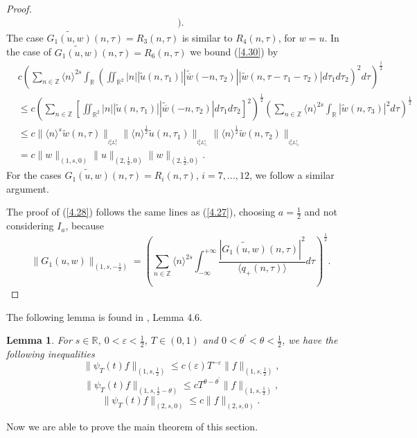 \documentclass[reqno]{amsart}
\newtheorem{lemma}{Lemma}[section]
\numberwithin{equation}{section}
\begin{document}
\begin{proof}
\begin{align*}
{)}\text{.}
\end{align*}
The case $\widetilde{G_{1}(u,w)}(n,\tau)=R_{3}(n,\tau)$ is similar
to $R_{4}(n,\tau)$, for $w=u$. In the case of $\widetilde{G_{1}(u,w)}(n,\tau)=R_{6}(n,\tau)$ we bound (\ref{4.30}) by
\begin{equation*}
\begin{split}
&  c\left(  \sum\limits_{n\in\mathbb{Z}}\langle n\rangle^{2s}\int
\nolimits_{\mathbb{R}}\left(
\iint\nolimits_{\mathbb{R}^{2}}| n| |\widetilde{u}(n,\tau_{1})|
|\widetilde{\overline{w}}(-n,\tau_{2})|
|\widetilde {w}(n,\tau-\tau_{1}-\tau_{2})| d\tau_{1}d\tau_{2}\right)  ^{2}d\tau\right)  ^{\frac{1}{2}}\\
&  \leq c\left(  \sum\limits_{n\in\mathbb{Z}}\left[  \iint
\nolimits_{\mathbb{R}^{2}}| n| |\widetilde {u}(n,\tau_{1})|
|\widetilde{\overline{w}}(-n,\tau_{2})| d\tau_{1}d\tau_{2}\right]^{2}\right)^{\frac{1}{2}}
\left(\sum\limits_{n\in\mathbb{Z}}\langle n\rangle^{2s}
\int\nolimits_{\mathbb{R}}|\widetilde{w}(n,\tau_3)| ^{2}d\tau\right)^{\frac{1}{2}}\\
&  \leq c\| \langle n\rangle^{s}\widetilde{w}(n,\tau)\|_{_{l_{n}^{2}L_{\tau}^{2}}}
\|\langle n\rangle^{\frac{1}{2}}\widetilde{u}(n,\tau_{1})\|_{_{l_{n}^{2}L_{\tau_{1}}^{1}}}
\| \langle n\rangle^{\frac{1}{2}}\widetilde{w}(n,\tau_{2})\|_{_{l_{n}^{2}L_{\tau_{2}}^{1}}}\\
&  =c\| w\| _{(1,s,0)}\| u\| _{(2,\frac12,0)}\| w\| _{(2,\frac12,0)}.
\end{split}
\end{equation*}
For the cases $\widetilde{G_{1}(u,w)}(n,\tau)=R_{i}(n,\tau)$,
$i=7,...,12$, we follow a similar argument.

The proof of (\ref{4.28}) follows the same lines as (\ref{4.27}), choosing
$a=\frac{1}{2}$ and not considering $I_{a}$, because
\begin{equation}\label{4.45}
\| G_{1}(u,w)\| _{(1,s,- \frac12 )}=\left(
\sum\limits_{n\in\mathbb{Z}}\langle n\rangle^{2s}\int_{-\infty
}^{+\infty}\frac{| \widetilde{G_{1}(u,w)}(n,\tau)| ^{2}}{\langle q_{+}(n,\tau)\rangle}d\tau\right)  ^{\frac{1}{2}}\text{.}\end{equation}
\end{proof}
The following lemma is found in \cite{38}, Lemma 4.6.
\begin{lemma} For  $s\in\mathbb{R}$, $0<\varepsilon<\frac{1}{2}$, $T\in\left(
0,1\right)$ and $0<\theta^{\prime}<\theta<\frac{1}{2}$, we have the following
inequalities\[
\| \psi_{T}(t)f\| _{(1,s, \frac12)}
\leq c(\varepsilon)T^{-\varepsilon}\| f\| _{(1,s,\frac12
)}\text{,}
\]
\[
\| \psi_{T}(t)f\| _{(1,s,
\frac12
-\theta)}\leq cT^{\theta-\theta^{\prime}}\| f\| _{(1,s,\frac12
)}\text{,}\]\[
\| \psi_{T}(t)f\| _{(2,s,0)}\leq c\|
f\|
_{(2,s,0)}\text{.}\]
\end{lemma}
Now we are able to prove the main theorem of this section.
\end{document}
